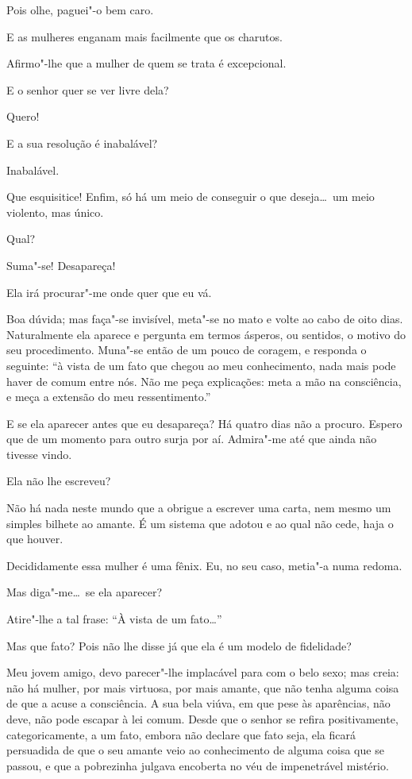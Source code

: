    Pois olhe, paguei"-o
bem caro.

  E as mulheres enganam mais facilmente que os
charutos.

  Afirmo"-lhe que a mulher de quem se trata é
excepcional.

  E o senhor quer se ver livre dela?

  Quero!

  E a sua resolução é inabalável? 

  Inabalável.

  Que esquisitice! Enfim, só há um meio de conseguir o que
deseja\ldots\ um meio violento, mas único.

  Qual?

  Suma"-se! Desapareça!

  Ela irá procurar"-me onde quer que eu vá.

  Boa dúvida; mas faça"-se invisível, meta"-se no mato e volte
ao cabo de oito dias. Naturalmente ela aparece e pergunta em termos
ásperos, ou sentidos, o motivo do seu procedimento. Muna"-se então de um
pouco de coragem, e responda o seguinte: ``à vista de um
fato que chegou ao meu conhecimento, nada mais pode haver de comum
entre nós. Não me peça explicações: meta a mão na consciência, e meça a
extensão do meu ressentimento.''

  E se ela aparecer antes que eu desapareça? Há
quatro dias não a procuro. Espero que de um momento para outro surja
por aí. Admira"-me até que ainda não tivesse vindo.

  Ela não lhe escreveu?

  Não há nada neste mundo que a obrigue a
escrever uma carta, nem mesmo um simples bilhete ao amante. É um
sistema que adotou e ao qual não cede, haja o que houver.

 Decididamente essa mulher é uma fênix. Eu,
no seu caso, metia"-a numa redoma.

  Mas diga"-me\ldots\ se ela aparecer?

  Atire"-lhe a tal frase: ``À
vista de um fato\ldots''

   Mas que fato?
Pois não lhe disse já que ela é um modelo de fidelidade?

  Meu jovem
amigo, devo parecer"-lhe implacável para com o belo sexo; mas creia: não
há mulher, por mais virtuosa, por mais amante, que não tenha alguma
coisa de que a acuse a consciência. A sua bela viúva, em que pese às
aparências, não deve, não pode escapar à lei comum. Desde que o senhor
se refira positivamente, categoricamente, a um fato, embora não declare
que fato seja, ela ficará persuadida de que o seu amante veio ao
conhecimento de alguma coisa que se passou, e que a pobrezinha julgava
encoberta no véu de impenetrável mistério.


